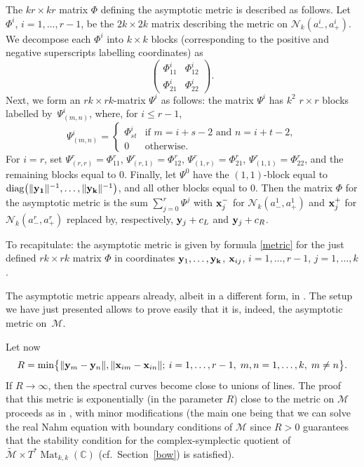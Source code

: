 \documentclass[10pt,a4paper]{amsart}
\newcommand{\cx}{{\mathbb C}}
\newcommand{\diag}{\operatorname{diag}}
\newcommand{\Mat}{\operatorname{Mat}}
\numberwithin{equation}{section}
\newcommand{\sM}{{\mathcal{M}}} %
\newcommand{\sN}{{\mathcal{N}}}
\begin{document}
{ The $kr\times kr$ matrix $\Phi$ defining the asymptotic metric is described as follows. Let $\Phi^i$, $i=1,\dots,r-1$, be the $2k\times 2k$ matrix describing the metric on $\sN_k(a_-^{i},a_+^{i})$. We decompose each $\Phi^i$ into $k\times k$ blocks (corresponding to the positive and negative superscripts labelling coordinates) as
\[
\begin{pmatrix} \Phi_{11}^i & \Phi^i_{12}\\
 \Phi_{21}^i & \Phi^i_{22}\end{pmatrix}.
 \]
Next, we form an $rk\times rk$-matrix $\Psi^i$ as follows: the matrix $\Psi^i$ has $k^2$ $r\times
 r$ blocks labelled by~$\Psi^i_{(m,n)}$, where, for $i\leq r-1$,
\[
\Psi^i_{(m,n)}=\begin{cases} \Phi_{st}^i & \text{if $m=i+s-2$ and $n=i+t-2$},\\
0& \text{otherwise}.\end{cases}
\]
 For $i=r$, set $\Psi^r_{(r,r)}=\Phi^r_{11}$, $\Psi^r_{(r,1)}=\Phi^r_{12}$, $\Psi^r_{(1,r)}=\Phi_{21}^r$, $\Psi^r_{(1,1)}=\Phi_{22}^r$, and the remaining blocks equal to $0$. Finally, let $\Psi^0$ have the $(1,1)$-block equal to $\diag\bigl(\|{\bf y_1}\|^{-1},\dots, \|{\bf y_k}\|^{-1}\bigr)$, and all other blocks equal to $0$. Then the matrix $\Phi$ for the asymptotic metric is the sum $\sum_{j=0}^r \Psi^j$ with ${\bf x}_j^-$ for $\sN_k(a_-^{1},a_+^1)$ and ${\bf x}_j^+$ for $\sN_k(a_-^{r},a_+^r)$ replaced by, respectively, ${\bf y}_j+c_L$ and ${\bf y}_j+c_R$.

 To recapitulate: the asymptotic metric is given by formula \eqref{metric} for the just defined $rk\times rk$ matrix $\Phi$ in coordinates ${\bf y}_1,\dots,{\bf y_k}$, ${\bf x}_{ij}$, $i=1,\dots, r-1$, $j=1,\dots,k$.
\begin{Remark} The asymptotic metric appears already, albeit in a different form, in \cite[Section~9]{Che2}. The setup we have just presented allows to prove easily that it is, indeed, the asymptotic metric on~$\sM$.
\end{Remark}

 Let now
 \[
 R=\min\bigl\{\|{\bf y}_m-{\bf y}_n\|,\|{\bf x}_{im}-{\bf x}_{in}\|;\: i=1,\dots,r-1,\; m,n=1,\dots,k,\; m\neq n\bigr\}.
 \]
 If $R\to \infty$, then the spectral curves become close to unions of lines.
 The proof that this metric is exponentially (in the parameter $R$) close to the metric on $\sM$ proceeds as in \cite[Theorem~9.1]{BSU}, with minor modifications (the main one being that we can solve the real Nahm equation with boundary conditions of $\sM$ since $R>0$ guarantees that the stability condition for the complex-symplectic quotient of $\tilde\sM\times T^\ast \Mat_{k,k}(\cx)$ (cf.\ Section~\ref{bow}) is satisfied).

}
\end{document}
